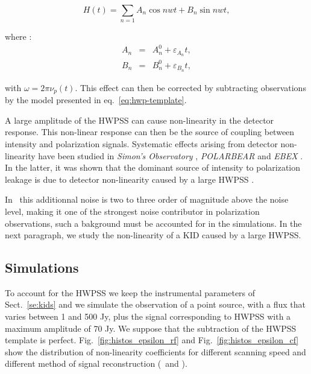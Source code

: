 \begin{equation}
H(t) = \sum_{n=1} A_{n} \cos nwt + B_{n} \sin nwt , 
\label{eq:hwp-template}
\end{equation}

where : 
\begin{eqnarray}
A_{n}  &=& A_{n}^{0} + \varepsilon_{A_{n}}t,\\
B_{n}  &=& B_{n}^{0} + \varepsilon_{B_{n}}t, 
\end{eqnarray}

with $\omega = 2 \pi \nu_{p}(t)$.
This effect can then be corrected by subtracting observations by the model presented in eq.~\ref{eq:hwp-template}. 

A large amplitude of the HWPSS can cause non-linearity in the detector response. This non-linear response can then be the source of coupling between intensity and polarization signals. Systematic effects arising from detector non-linearity have been studied in \emph{Simon's Observatory} \citep{2018SPIE10708E..48S}, \emph{POLARBEAR} \citep{2017JCAP...05..008T} and \emph{EBEX} \citep{2017arXiv171101314D}. In the latter, it was shown that the dominant source of intensity to polarization leakage is due to detector non-linearity caused by a large HWPSS \citep{2017arXiv171101314D}.

In \nikad\ this additionnal noise is two to three order of magnitude above the noise level, making it one of the strongest noise contributor in polarization observations, such a bakground must be accounted for in the simulations. In the next paragraph, we study the non-linearity of a KID caused by a large HWPSS. 


\subsection{Simulations}

To account for the HWPSS we keep the instrumental parameters of Sect.~\ref{se:kids} and we simulate the observation of a point source, with a flux that varies between 1 and 500 Jy, plus the signal corresponding to HWPSS with a maximum amplitude of 70 Jy. We suppose that the subtraction of the HWPSS template is perfect. Fig.~\ref{fig:histos_epsilon_rf} and Fig.~\ref{fig:histos_epsilon_cf} show the distribution of non-linearity coefficients for different scanning speed and different method of signal reconstruction (\rf\ and \cf). 

